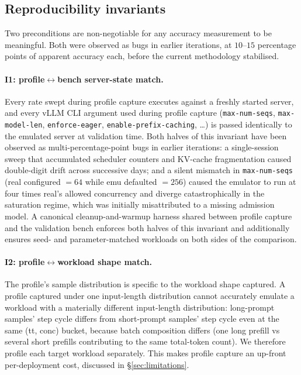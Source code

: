 \documentclass[conference]{IEEEtran}
\begin{document}
\subsection{Reproducibility invariants}
\label{sec:design-invariants}

Two preconditions are non-negotiable for any accuracy measurement to
be meaningful. Both were observed as bugs in earlier iterations, at
$10$--$15$ percentage points of apparent accuracy each, before the
current methodology stabilised.

\paragraph{I1: profile$\leftrightarrow$bench server-state match.}
Every rate swept during profile capture executes against a freshly
started server, and every vLLM CLI argument used during profile
capture (\texttt{max-num-seqs}, \texttt{max-model-len},
\texttt{enforce-eager}, \texttt{enable-prefix-caching}, \ldots) is
passed identically to the emulated server at validation time. Both
halves of this invariant have been observed as multi-percentage-point
bugs in earlier iterations: a single-session sweep that accumulated
scheduler counters and KV-cache fragmentation caused double-digit
drift across successive days; and a silent mismatch in
\texttt{max-num-seqs} (real configured $=64$ while emu defaulted
$=256$) caused the emulator to run at four times real's allowed
concurrency and diverge catastrophically in the saturation regime,
which was initially misattributed to a missing admission model. A
canonical cleanup-and-warmup harness shared between profile capture
and the validation bench enforces both halves of this invariant and
additionally ensures seed- and parameter-matched workloads on both
sides of the comparison.

\paragraph{I2: profile$\leftrightarrow$workload shape match.} The
profile's sample distribution is specific to the workload shape
captured. A profile captured under one input-length distribution
cannot accurately emulate a workload with a materially different
input-length distribution: long-prompt samples' step cycle differs
from short-prompt samples' step cycle even at the same (tt, conc)
bucket, because batch composition differs (one long prefill vs
several short prefills contributing to the same total-token count).
We therefore profile each target workload separately. This makes
profile capture an up-front per-deployment cost, discussed in
\S\ref{sec:limitations}.
\end{document}
